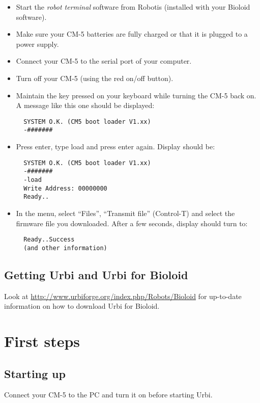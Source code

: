 \begin{itemize}
\item Start the \emph{robot terminal} software from Robotis (installed with
  your Bioloid software).
\item Make sure your CM-5 batteries are fully charged or that it is plugged
  to a power supply.
\item Connect your CM-5 to the serial port of your computer.
\item Turn off your CM-5 (using the red on/off button).
\item Maintain the \samp{\#} key pressed on your keyboard while turning the
  CM-5 back on. A message like this one should be displayed:

\begin{verbatim}
  SYSTEM O.K. (CM5 boot loader V1.xx)
  -#######
\end{verbatim}

\item Press enter, type load and press enter again. Display should be:
\begin{verbatim}
  SYSTEM O.K. (CM5 boot loader V1.xx)
  -#######
  -load
  Write Address: 00000000
  Ready..
\end{verbatim}

\item In the menu, select ``Files'', ``Transmit file'' (Control-T) and
  select the firmware file you downloaded. After a few seconds, display
  should turn to:
\begin{verbatim}
  Ready..Success
  (and other information)
\end{verbatim}
\end{itemize}

\subsection{Getting Urbi and Urbi for Bioloid}

Look at \url{http://www.urbiforge.org/index.php/Robots/Bioloid} for
up-to-date information on how to download Urbi for Bioloid.

\section{First steps}

\subsection{Starting up}
Connect your CM-5 to the PC and turn it on before starting Urbi.

